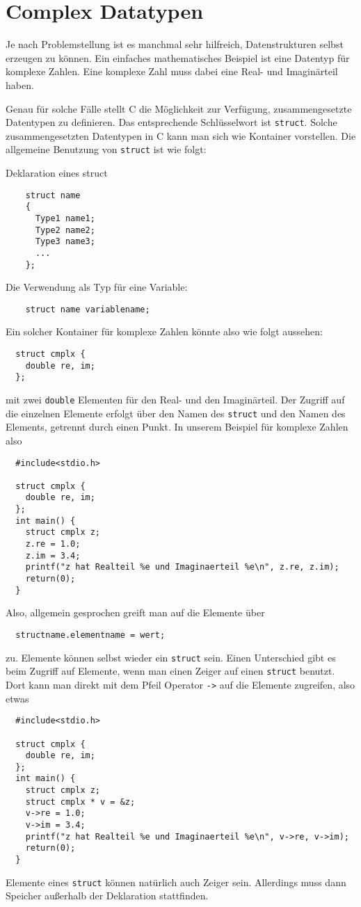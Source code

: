 \section{Complex Datatypen}

Je nach Problemstellung ist es manchmal sehr hilfreich, Datenstrukturen selbst erzeugen zu können.
Ein einfaches mathematisches Beispiel ist eine Datentyp für komplexe Zahlen.
Eine komplexe Zahl muss dabei eine Real- und Imaginärteil haben.

Genau für solche Fälle stellt C die Möglichkeit zur Verfügung, zusammengesetzte Datentypen zu definieren.
Das entsprechende Schlüsselwort ist \verb|struct|.
Solche zusammengesetzten Datentypen in C kann man sich wie Kontainer vorstellen.
Die allgemeine Benutzung von \verb|struct| ist wie folgt:
\begin{myalertblock}{Deklaration eines struct}
  \begin{lstlisting}
    struct name
    {
      Type1 name1;
      Type2 name2;
      Type3 name3;
      ...
    };
  \end{lstlisting}
  \vspace{-0.4cm}
  Die Verwendung als Typ für eine Variable:
  \begin{lstlisting}
    struct name variablename;
  \end{lstlisting}
  \vspace{-0.4cm} 
\end{myalertblock}
Ein solcher Kontainer für komplexe Zahlen könnte also wie folgt aussehen:
\begin{lstlisting}
  struct cmplx {
    double re, im;
  };
\end{lstlisting}
mit zwei \verb|double| Elementen für den Real- und den Imaginärteil. 
Der Zugriff auf die einzelnen Elemente erfolgt über den Namen des \verb|struct| und den Namen des Elements, getrennt durch einen Punkt.
In unserem Beispiel für komplexe Zahlen also 
\begin{lstlisting}
  #include<stdio.h>

  struct cmplx {
    double re, im;
  };
  int main() {
    struct cmplx z;
    z.re = 1.0;
    z.im = 3.4;
    printf("z hat Realteil %e und Imaginaerteil %e\n", z.re, z.im);
    return(0);
  }
\end{lstlisting}
Also, allgemein gesprochen greift man auf die Elemente über 
\begin{lstlisting}
  structname.elementname = wert;
\end{lstlisting}
zu.
Elemente können selbst wieder ein \verb|struct| sein.
Einen Unterschied gibt es beim Zugriff auf Elemente, wenn man einen Zeiger auf einen \verb|struct| benutzt.
Dort kann man direkt mit dem Pfeil Operator \verb|->| auf die Elemente zugreifen, also etwas
\begin{lstlisting}
  #include<stdio.h>

  struct cmplx {
    double re, im;
  };
  int main() {
    struct cmplx z;
    struct cmplx * v = &z;
    v->re = 1.0;
    v->im = 3.4;
    printf("z hat Realteil %e und Imaginaerteil %e\n", v->re, v->im);
    return(0);
  }
\end{lstlisting}
Elemente eines \verb|struct| können natürlich auch Zeiger sein.
Allerdings muss dann Speicher außerhalb der Deklaration stattfinden.

